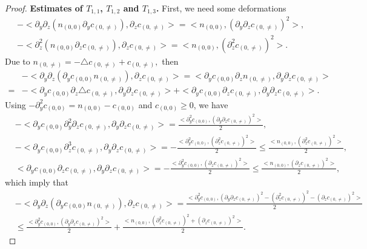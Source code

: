 \documentclass[10pt,a4paper]{amsart}
\begin{document}
\begin{proof}
		\textbf{Estimates of $T_{1,1}$, $T_{1,2}$ and $T_{1,3}$.}	
		First, we need some deformations
		\begin{align}
			&-<\partial_y\partial_z(n_{(0,0)}\partial_yc_{(0,\neq)}),\partial_zc_{(0,\neq)}>=
			<n_{(0,0)},(\partial_y\partial_zc_{(0,\neq)})^2>,
			\label{n0_temp1}\\
			&-<\partial_z^2(n_{(0,0)}\partial_zc_{(0,\neq)}),\partial_zc_{(0,\neq)}>=<n_{(0,0)},(\partial_z^2c_{(0,\neq)})^2>.\label{n0_temp2}
		\end{align}
		Due to $n_{(0,\neq)}=-\triangle c_{(0,\neq)}+c_{(0,\neq)},$ 
		then 
		\begin{equation*}
			\begin{aligned}
				&-<\partial_y\partial_z(\partial_{y}c_{(0,0)}n_{(0,\neq)}),
				\partial_zc_{(0,\neq)}>=
				<\partial_{y}c_{(0,0)}\partial_zn_{(0,\neq)},
				\partial_y\partial_zc_{(0,\neq)}>\\
				=&-<\partial_{y}c_{(0,0)}\partial_z\triangle c_{(0,\neq)},
				\partial_y\partial_zc_{(0,\neq)}>
				+<\partial_{y}c_{(0,0)}\partial_z c_{(0,\neq)},
				\partial_y\partial_zc_{(0,\neq)}>.			
			\end{aligned}
		\end{equation*}
		Using $-\partial_y^2c_{(0,0)}=n_{(0,0)}-c_{(0,0)}$ and $c_{(0,0)}\geq0$, we have 
		\begin{align*}
			&-<\partial_{y}c_{(0,0)}\partial_y^2\partial_z c_{(0,\neq)},
			\partial_y\partial_zc_{(0,\neq)}>=\frac{<\partial_{y}^2c_{(0,0)},(\partial_y\partial_zc_{(0,\neq)})^2>}{2},\\
			&-<\partial_{y}c_{(0,0)}\partial_z^3 c_{(0,\neq)},
			\partial_y\partial_zc_{(0,\neq)}>=
			-\frac{<\partial_{y}^2c_{(0,0)},(\partial_z^2c_{(0,\neq)})^2>}{2}
			\leq \frac{<n_{(0,0)},(\partial_z^2c_{(0,\neq)})^2>}{2}
			,\\
			&<\partial_{y}c_{(0,0)}\partial_z c_{(0,\neq)},
			\partial_y\partial_zc_{(0,\neq)}>=
			-\frac{<\partial_{y}^2c_{(0,0)},(\partial_zc_{(0,\neq)})^2>}{2}
			\leq \frac{<n_{(0,0)},(\partial_zc_{(0,\neq)})^2>}{2},
		\end{align*}	
		which imply that 	
		\begin{equation}\label{n0_temp3}
			\begin{aligned}
				&-<\partial_y\partial_z(\partial_{y}c_{(0,0)}n_{(0,\neq)}),
				\partial_zc_{(0,\neq)}>
				=\frac{<\partial_{y}^2c_{(0,0)},(\partial_y\partial_zc_{(0,\neq)})^2-(\partial_z^2c_{(0,\neq)})^2-(\partial_zc_{(0,\neq)})^2>}{2}
				\\
				&\leq \frac{<\partial_{y}^2c_{(0,0)}
					,(\partial_y\partial_zc_{(0,\neq)})^2>}{2}
				+\frac{<n_{(0,0)},(\partial_z^2c_{(0,\neq)})^2+
					(\partial_zc_{(0,\neq)})^2>}{2}.
			\end{aligned}
		\end{equation}
		

\end{proof}
\end{document}
